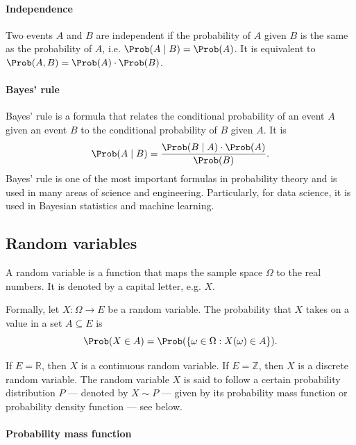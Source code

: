 \paragraph{Independence}

Two events $A$ and $B$ are independent if the probability of $A$ given $B$ is the
same as the probability of $A$, i.e. $\Prob(A \mid B) = \Prob(A)$.  It is equivalent to
$\Prob(A, B) = \Prob(A) \cdot \Prob(B)$.

\paragraph{Bayes' rule}

Bayes' rule is a formula that relates the conditional probability of an event $A$
given an event $B$ to the conditional probability of $B$ given $A$.  It is
\begin{equation}
  \label{eq:bayes}
  \Prob(A \mid B) = \frac{\Prob(B \mid A) \cdot \Prob(A)}{\Prob(B)}\text{.}
\end{equation}
Bayes' rule is one of the most important formulas in probability theory and is used
in many areas of science and engineering.  Particularly, for data science, it is
used in Bayesian statistics and machine learning.

\subsection{Random variables}

A random variable is a function that maps the sample space $\Omega$ to the real
numbers.  It is denoted by a capital letter, e.g. $X$.

Formally, let $X : \Omega \rightarrow E$ be a random variable.  The
probability that $X$ takes on a value in a set $A \subseteq E$ is
\begin{equation}
  \label{eq:rv}
  \Prob(X \in A) = \Prob(\{\omega \in \Omega : X(\omega) \in A\})\text{.}
\end{equation}

If $E = \mathbb{R}$, then $X$ is a continuous random variable.  If $E = \mathbb{Z}$,
then $X$ is a discrete random variable.  The random variable $X$ is said to follow
a certain probability distribution $P$ --- denoted by $X \sim P$ --- given by its
probability mass function or probability density function --- see below.

\paragraph{Probability mass function}

